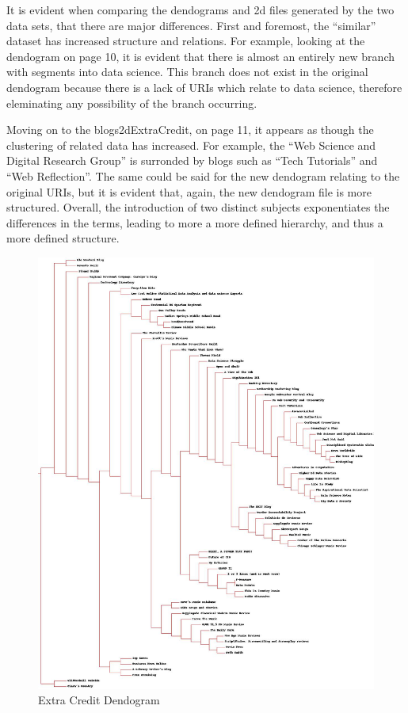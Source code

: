 \documentclass[11pt]{scrartcl} %
\begin{document}
\tabto{2.0cm} It is evident when comparing the dendograms and 2d files generated by the two data sets, that there are major differences. First and foremost, the ``similar'' dataset has increased structure and relations. For example, looking at the dendogram on page 10, it is evident that there is almost an entirely new branch with segments into data science. This branch does not exist in the original dendogram because there is a lack of URIs which relate to data science, therefore eleminating any possibility of the branch occurring. \newline \newline

\tabto{2.0cm} Moving on to the blogs2dExtraCredit, on page 11, it appears as though the clustering of related data has increased. For example, the ``Web Science and Digital Research Group'' is surronded by blogs such as ``Tech Tutorials'' and ``Web Reflection''. The same could be said for the new dendogram relating to the original URIs, but it is evident that, again, the new dendogram file is more structured. Overall, the introduction of two distinct subjects exponentiates the differences in the terms, leading to more a more defined hierarchy, and thus a more defined structure.

\begin{figure}[p]%
        \includegraphics[width=.99\textwidth,height=.99\textheight]{../Figures/blogclustExtra.jpg}%
        \caption{Extra Credit Dendogram}
    \end{figure}%
\end{document}
